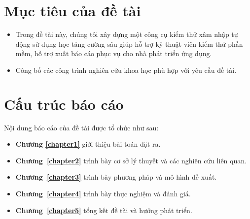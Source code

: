 


\section{Mục tiêu của đề tài}

\begin{itemize}
    \item Trong đề tài này, chúng tôi xây dựng một công cụ kiểm thử xâm nhập tự động sử dụng học tăng cường sâu giúp hỗ trợ kỹ thuật viên kiểm thử phần mềm, hỗ trợ xuất báo cáo phục vụ cho nhà phát triển ứng dụng.
    \item 
    Công bố các công trình nghiên cứu khoa học phù hợp với yêu cầu đề tài.
\end{itemize}

\section{Cấu trúc báo cáo}
Nội dung báo cáo của đề tài được tổ chức như sau:
\begin{itemize}
    \item \textbf{Chương \ref{chapter1}} giới thiệu bài toán đặt ra.
    \item \textbf{Chương~\ref{chapter2}} trình bày cơ sở lý thuyết  và các nghiên cứu liên quan.
    \item \textbf{Chương~\ref{chapter3}} trình bày phương pháp và mô hình đề xuất.
    \item \textbf{Chương~\ref{chapter4}} trình bày thực nghiệm và đánh giá.
    \item \textbf{Chương~\ref{chapter5}} tổng kết đề tài và hướng phát triển.
\end{itemize}
